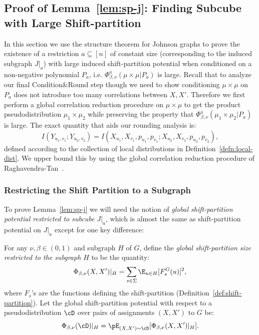 \subsection{Proof of Lemma~\ref{lem:sp-j}: Finding Subcube with Large Shift-partition}\label{sec:large-potential}

In this section we use the structure theorem for Johnson graphs
to prove the existence of a restriction $a \subseteq [n]$ of constant size (corresponding to the induced subgraph $J|_a$) with large induced shift-partition potential when conditioned on a non-negative polynomial $P_a$, i.e. $\Phi^a_{\beta,\nu}(\mu \times \mu | P_a)$ is large. Recall that to analyze our final Condition\&Round step though we need to show conditioning $\mu \times \mu$ on $P_a$ does not introduce too many correlations between $X, X'$. Therefore we first perform a global correlation reduction procedure on $\mu \times \mu$ to get the product pseudodistribution $\mu_1 \times \mu_2$ while preserving the property that $\Phi^a_{\beta,\nu}(\mu_1 \times \mu_2 | P_a)$ is large.
The exact quantity that aids our rounding analysis is: 
\[I(Y_{u_1,v_1};Y_{u_2,v_2}) =  I(X_{u_1},X_{v_1},p_{u_1},p_{v_1};X_{u_2},X_{v_2},p_{u_2},p_{v_2}),\] 
defined according to the collection of local distributions in Definition~\ref{defn:local-dist}. We upper bound this by using the global correlation reduction procedure of Raghavendra-Tan~\cite{RT12}. 

\subsubsection{Restricting the Shift Partition to a Subgraph}
To prove Lemma~\ref{lem:sp-j} we will need the notion of
\emph{global shift-partition potential restricted to subcube $J|_a$}, which is almost the same as shift-partition potential on $J|_a$ except for one key difference:
\begin{definition}\label{def:res-shift}
For any $\nu,\beta \in (0,1)$ and subgraph $H$ of $G$, define the {\em global shift-partition size restricted to the subgraph $H$} to be the quantity:
\[
\Phi_{\beta,\nu}(X,X')|_H = \sum_{s \in \Sigma} \E_{u \in H} [F_s^{G}(u)]^2,
\]
where $F_s$'s are the functions defining the shift-partition (Definition~\ref{def:shift-partition}). 
Let the global shift-partition potential with respect to a pseudodistribution $\cD$ over pairs of assignments $(X,X')$ to $G$ be:
\[
\Phi_{\beta,\nu}(\cD)|_H = \pE_{(X,X') \sim \cD}[\Phi_{\beta,\nu}(X,X')|_H].
\]
\end{definition}


